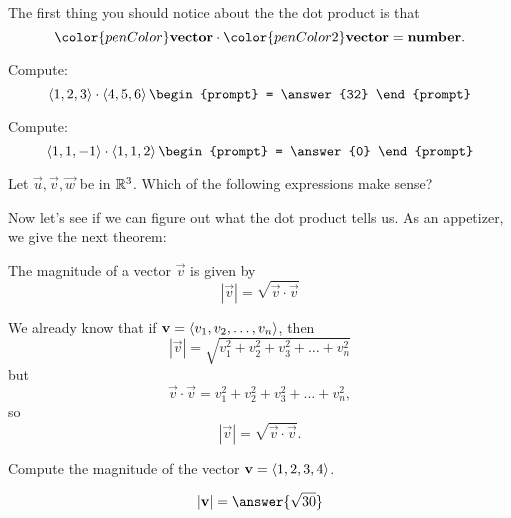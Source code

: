 \documentclass{ximera}
\begin{document}
The first thing you should notice about the the dot product is that
\[
{\color{penColor}\mathbf{vector}}\cdot {\color{penColor2}\mathbf{vector}} = \mathbf{number}.
\]
\begin{question}
  Compute:
  \[
  \vector{1,2,3}\cdot\vector{4,5,6}
  \begin{prompt}
    = \answer{32}
  \end{prompt}
  \]
  \begin{question}
  Compute:
  \[
  \vector{1,1,-1}\cdot\vector{1,1,2}
  \begin{prompt}
    = \answer{0}
  \end{prompt}
  \]
\end{question}
\end{question}

\begin{question}
  Let $\vec{u},\vec{v},\vec{w}$ be in $\mathbb R^3$. Which of the following
  expressions make sense?
  \begin{selectAll}
  \end{selectAll}
\end{question}

Now let's see if we can figure out what the dot product tells us. As
an appetizer, we give the next theorem:

\begin{theorem}
  The magnitude of a vector $\vec{v}$ is given by
  \[
  |\vec{v}|=\sqrt{\vec{v}\cdot\vec{v}}
  \]
  \begin{explanation}
    We already know that if $\mathbf{v} = \left\langle v_1,v_2,\dots,v_n\right\rangle$,
    then
    \[
    |\vec{v}| = \sqrt{v_1^2+v_2^2+v_3^2+\dots+v_n^2}
    \]
    but
    \[
    \vec{v} \cdot \vec{v} = v_1^2+v_2^2+v_3^2+\dots+v_n^2,
    \]
    so
    \[
    |\vec{v}|=\sqrt{\vec{v}\cdot\vec{v}}.
    \]
  \end{explanation}
\end{theorem}

\begin{question}
  Compute the magnitude of the vector $\mathbf{v} = \left\langle 1,2,3,4\right\rangle$.
  \begin{prompt}
    \[
    |\vec{v}| = \answer{\sqrt{30}}
    \]
  \end{prompt}
\end{question}
\end{document}

